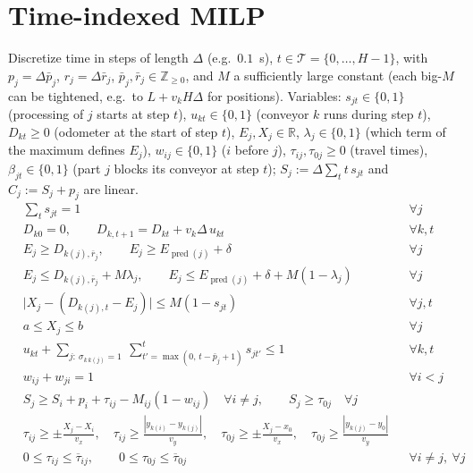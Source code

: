 \documentclass[11pt,a4paper]{article}
\theoremstyle{plain}
\theoremstyle{definition}
\theoremstyle{remark}
\newcommand{\pred}{\operatorname{pred}}
\newcommand{\R}{\mathbb{R}}
\begin{document}



\clearpage
\appendix
\section{Time-indexed MILP}\label{app:milp}
Discretize time in steps of length $\Delta$ (e.g.\ $0.1$~s), $t\in\mathcal T=\{0,\dots,H-1\}$,
with $p_j=\Delta\bar p_j$, $r_j=\Delta\bar r_j$, $\bar p_j,\bar r_j\in\mathbb Z_{\ge0}$, and
$M$ a sufficiently large constant (each big-$M$ can be tightened, e.g.\ to $L+v_kH\Delta$
for positions). Variables: $s_{jt}\in\{0,1\}$ (processing of $j$ starts at step $t$),
$u_{kt}\in\{0,1\}$ (conveyor $k$ runs during step $t$), $D_{kt}\ge0$ (odometer at the start
of step $t$), $E_j,X_j\in\R$, $\lambda_j\in\{0,1\}$ (which term of the maximum defines
$E_j$), $w_{ij}\in\{0,1\}$ ($i$ before $j$), $\tau_{ij},\tau_{0j}\ge0$ (travel times),
$\beta_{jt}\in\{0,1\}$ (part $j$ blocks its conveyor at step $t$); $S_j:=\Delta\sum_tt\,s_{jt}$
and $C_j:=S_j+p_j$ are linear.
\begin{align}
&\textstyle\sum_{t}s_{jt}=1 && \forall j \tag{M1}\\
&D_{k0}=0,\qquad D_{k,t+1}=D_{kt}+v_k\Delta\,u_{kt} && \forall k,t \tag{M2}\\
&E_j\ge D_{k(j),\bar r_j},\qquad E_j\ge E_{\pred(j)}+\delta && \forall j \tag{M3a}\\
&E_j\le D_{k(j),\bar r_j}+M\lambda_j,\qquad E_j\le E_{\pred(j)}+\delta+M(1-\lambda_j) && \forall j \tag{M3b}\\
&\bigl|X_j-(D_{k(j),t}-E_j)\bigr|\le M(1-s_{jt}) && \forall j,t \tag{M4}\\
&a\le X_j\le b && \forall j \tag{M5}\\
&u_{kt}+\sum_{j:\ \sigma_{k\,k(j)}=1}\ \sum_{t'=\max(0,\,t-\bar p_j+1)}^{t}s_{jt'}\le 1 && \forall k,t \tag{M6}\\
&w_{ij}+w_{ji}=1 && \forall i<j \tag{M7}\\
&S_j\ge S_i+p_i+\tau_{ij}-M_{ij}(1-w_{ij})\quad\forall i\neq j,\qquad S_j\ge\tau_{0j}\quad\forall j \tag{M8}\\
&\tau_{ij}\ge\pm\frac{X_j-X_i}{v_x},\quad \tau_{ij}\ge\frac{|y_{k(i)}-y_{k(j)}|}{v_y},\quad
 \tau_{0j}\ge\pm\frac{X_j-x_0}{v_x},\quad \tau_{0j}\ge\frac{|y_{k(j)}-y_0|}{v_y} \tag{M9}\\
&0\le\tau_{ij}\le\overline\tau_{ij},\qquad 0\le\tau_{0j}\le\overline\tau_{0j} && \forall i\neq j,\ \forall j \tag{M9b}
\end{align}
\end{document}
